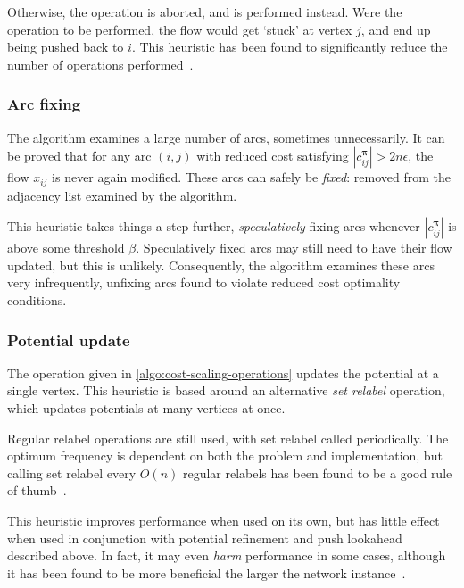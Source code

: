 Otherwise, the  operation is aborted, and  is performed instead. Were the  operation to be performed, the flow would get `stuck' at vertex $j$, and end up being pushed back to $i$. This heuristic has been found to significantly reduce the number of  operations performed~\cite{Goldberg:1997}.

\subsubsection{Arc fixing}
The algorithm examines a large number of arcs, sometimes unnecessarily. It can be proved that for any arc $(i,j)$ with reduced cost satisfying $\left|c^{\boldsymbol{\pi}}_{ij}\right| > 2n\epsilon$, the flow $x_{ij}$ is never again modified. These arcs can safely be \emph{fixed}: removed from the adjacency list examined by the algorithm. 

This heuristic takes things a step further, \emph{speculatively} fixing arcs whenever $\left|c^{\boldsymbol{\pi}}_{ij}\right|$ is above some threshold $\beta$. Speculatively fixed arcs may still need to have their flow updated, but this is unlikely. Consequently, the algorithm examines these arcs very infrequently, unfixing arcs found to violate reduced cost optimality conditions.

\subsubsection{Potential update}
The  operation given in \cref{algo:cost-scaling-operations} updates the potential at a single vertex. This heuristic is based around an alternative \emph{set relabel} operation, which updates potentials at many vertices at once.

Regular relabel operations are still used, with set relabel called periodically. The optimum frequency is dependent on both the problem and implementation, but calling set relabel every $O(n)$ regular relabels has been found to be a good rule of thumb~\cite{Goldberg:1997}.

This heuristic improves performance when used on its own, but has little effect when used in conjunction with potential refinement and push lookahead described above. In fact, it may even \emph{harm} performance in some cases, although it has been found to be more beneficial the larger the network instance~\cite{Bunnagel:1998}.